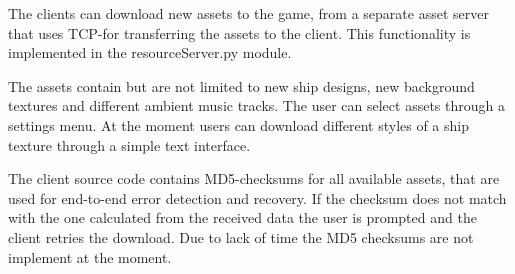 \documentclass[10pt,a4paper]{article}
\begin{document}
The clients can download new assets to the game, from a separate asset server
that uses TCP-for transferring the assets to the client. This functionality
is implemented in the resourceServer.py module.

The assets contain but are not limited to new ship designs, new background textures and
different ambient music tracks. The user can select assets through a settings menu.
At the moment users can download different styles of a ship texture through a simple
text interface.

The client source code
contains MD5-checksums for all available assets, that are used for end-to-end
error detection and recovery. If the checksum does not match with the one calculated
from the received data the user is prompted and the client retries the download.
Due to lack of time the MD5 checksums are not implement at the moment.

\newpage




 
 
\end{document}
